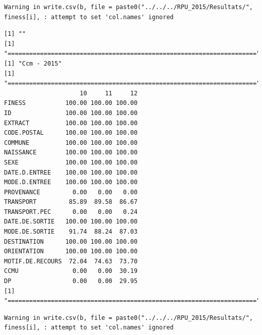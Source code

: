 \documentclass[]{article}
\begin{document}
\begin{verbatim}
Warning in write.csv(b, file = paste0("../../../RPU_2015/Resultats/",
finess[i], : attempt to set 'col.names' ignored
\end{verbatim}

\begin{verbatim}
[1] ""
[1] "====================================================================="
[1] "Ccm - 2015"
[1] "====================================================================="
                     10     11     12
FINESS           100.00 100.00 100.00
ID               100.00 100.00 100.00
EXTRACT          100.00 100.00 100.00
CODE.POSTAL      100.00 100.00 100.00
COMMUNE          100.00 100.00 100.00
NAISSANCE        100.00 100.00 100.00
SEXE             100.00 100.00 100.00
DATE.D.ENTREE    100.00 100.00 100.00
MODE.D.ENTREE    100.00 100.00 100.00
PROVENANCE         0.00   0.00   0.00
TRANSPORT         85.89  89.58  86.67
TRANSPORT.PEC      0.00   0.00   0.24
DATE.DE.SORTIE   100.00 100.00 100.00
MODE.DE.SORTIE    91.74  88.24  87.03
DESTINATION      100.00 100.00 100.00
ORIENTATION      100.00 100.00 100.00
MOTIF.DE.RECOURS  72.04  74.63  73.70
CCMU               0.00   0.00  30.19
DP                 0.00   0.00  29.95
[1] "====================================================================="
\end{verbatim}

\begin{verbatim}
Warning in write.csv(b, file = paste0("../../../RPU_2015/Resultats/",
finess[i], : attempt to set 'col.names' ignored
\end{verbatim}
\end{document}
